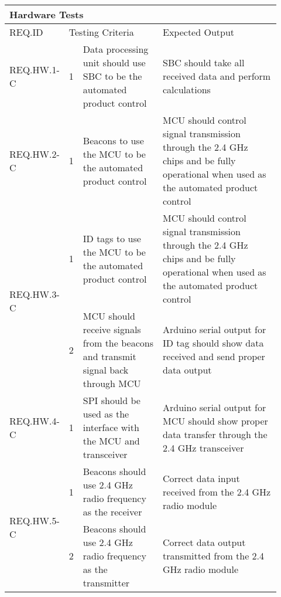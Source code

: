 \begin{table}[h!]
    \centering
    \begin{tabular}{|m{0.15\linewidth}|m{0.02\linewidth}|m{0.3\linewidth}|m{0.45\linewidth}|} 
    \hline
    \multicolumn{4}{|l|}{Hardware Tests}           \\ 
    \hline
    REQ.ID & \multicolumn{2}{l|}{Testing Criteria} & Expected Output         \\ 
    \hline
    REQ.HW.1-C                  
    & 1 
    & Data processing unit should use SBC to be the automated product control
    & SBC should take all received data and perform calculations   \\ 
    \hline
   
    REQ.HW.2-C                  
    & 1 
    & Beacons to use the MCU to be the automated product control
    & MCU should control signal transmission through the 2.4 GHz chips and be fully operational 
    when used as the automated product control         \\ 
    \hline
    
    \multirow{2}{*}{REQ.HW.3-C} 
    & 1 
    & ID tags to use the MCU to be the automated product control
    & MCU should control signal transmission through the 2.4 GHz chips and be fully operational 
    when used as the automated product control            \\ 
    \cline{2-4}
    & 2 
    & MCU should receive signals from the beacons and transmit signal back through MCU  
    & Arduino serial output for ID tag should show data received and send proper data output        \\
    \hline
    
    REQ.HW.4-C                  
    & 1 
    & SPI should be used as the interface with the MCU and transceiver
    & Arduino serial output for MCU should show proper data transfer through the 2.4 GHz transceiver   \\ 
    \hline
    
    \multirow{2}{*}{REQ.HW.5-C} 
    & 1 
    & Beacons should use 2.4 GHz radio frequency as the receiver     
    & Correct data input received from the 2.4 GHz radio module          \\ 
    \cline{2-4}
    & 2 
    & Beacons should use 2.4 GHz radio frequency as the transmitter     
    & Correct data output transmitted from the 2.4 GHz radio module   \\
    \hline
    

\end{tabular}
\end{table}
